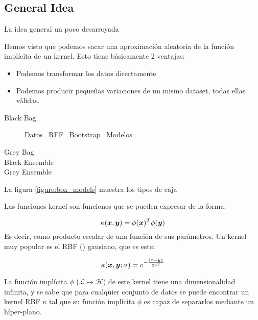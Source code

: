 \subsection{General Idea}
  La idea general un poco desarroyada

  \begin{note}
    Hemos visto que podemos sacar una aproximación aleatoria de la función
    implícita de un kernel. Esto tiene básicamente 2 ventajas:
    \begin{itemize}
      \item Podemos transformar los datos directamente
      \item Podemos producir pequeñas variaciones de un mismo dataset, todas
      ellas válidas.
    \end{itemize}

    \begin{description}
      \item[Black Bag] Datos \textrightarrow\ RFF \textrightarrow\ Bootstrap \textrightarrow\ Modelos
      \item[Grey Bag]
      \item[Black Ensemble]
      \item[Grey Ensemble]
    \end{description}

    La figura \ref{figure:box_models} muestra los tipos de caja
  \end{note}

  \boxPics

  Las funciones kernel son funciones que se pueden expresar de la forma:

  \begin{equation}
     \kappa(\bm{x}, \bm{y}) = \phi(\bm{x})^T\phi(\bm{y})
  \end{equation}
  Es decir, como producto escalar de una función de sus parámetros. Un kernel muy
  popular es el RBF () gausiano, que es este:

  \begin{equation}
   \kappa({\bm{x}, \bm{y}}; \sigma) = e^{-\frac{\norm{\bm{x} - \bm{y}}}{2\sigma^2}}
  \end{equation}

  La función implícita $\phi$ ($\mathcal{L} \mapsto \mathcal{H}$) de este kernel
  tiene una dimensionalidad infinita, y se sabe que para cualquier conjunto de
  datos se puede encontrar un kernel RBF $\kappa$ tal que su función implícita
  $\phi$ es capaz de separarlos mediante un híper-plano.

